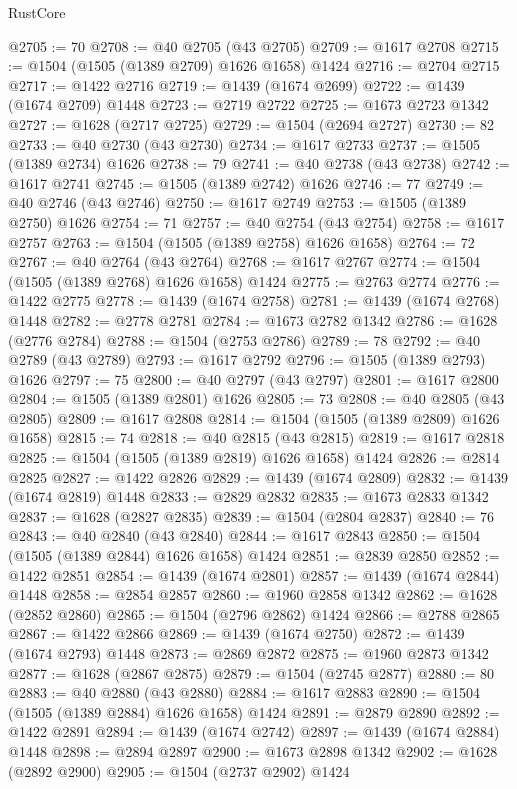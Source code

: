 \begin{lexlean}{RustCore}
\begin{coremodule}
@2705 := 70
@2708 := @40 @2705 (@43 @2705)
@2709 := @1617 @2708
@2715 := @1504 (@1505 (@1389 @2709) @1626 @1658) @1424
@2716 := @2704 @2715
@2717 := @1422 @2716
@2719 := @1439 (@1674 @2699)
@2722 := @1439 (@1674 @2709) @1448
@2723 := @2719 @2722
@2725 := @1673 @2723 @1342
@2727 := @1628 (@2717 @2725)
@2729 := @1504 (@2694 @2727)
@2730 := 82
@2733 := @40 @2730 (@43 @2730)
@2734 := @1617 @2733
@2737 := @1505 (@1389 @2734) @1626
@2738 := 79
@2741 := @40 @2738 (@43 @2738)
@2742 := @1617 @2741
@2745 := @1505 (@1389 @2742) @1626
@2746 := 77
@2749 := @40 @2746 (@43 @2746)
@2750 := @1617 @2749
@2753 := @1505 (@1389 @2750) @1626
@2754 := 71
@2757 := @40 @2754 (@43 @2754)
@2758 := @1617 @2757
@2763 := @1504 (@1505 (@1389 @2758) @1626 @1658)
@2764 := 72
@2767 := @40 @2764 (@43 @2764)
@2768 := @1617 @2767
@2774 := @1504 (@1505 (@1389 @2768) @1626 @1658) @1424
@2775 := @2763 @2774
@2776 := @1422 @2775
@2778 := @1439 (@1674 @2758)
@2781 := @1439 (@1674 @2768) @1448
@2782 := @2778 @2781
@2784 := @1673 @2782 @1342
@2786 := @1628 (@2776 @2784)
@2788 := @1504 (@2753 @2786)
@2789 := 78
@2792 := @40 @2789 (@43 @2789)
@2793 := @1617 @2792
@2796 := @1505 (@1389 @2793) @1626
@2797 := 75
@2800 := @40 @2797 (@43 @2797)
@2801 := @1617 @2800
@2804 := @1505 (@1389 @2801) @1626
@2805 := 73
@2808 := @40 @2805 (@43 @2805)
@2809 := @1617 @2808
@2814 := @1504 (@1505 (@1389 @2809) @1626 @1658)
@2815 := 74
@2818 := @40 @2815 (@43 @2815)
@2819 := @1617 @2818
@2825 := @1504 (@1505 (@1389 @2819) @1626 @1658) @1424
@2826 := @2814 @2825
@2827 := @1422 @2826
@2829 := @1439 (@1674 @2809)
@2832 := @1439 (@1674 @2819) @1448
@2833 := @2829 @2832
@2835 := @1673 @2833 @1342
@2837 := @1628 (@2827 @2835)
@2839 := @1504 (@2804 @2837)
@2840 := 76
@2843 := @40 @2840 (@43 @2840)
@2844 := @1617 @2843
@2850 := @1504 (@1505 (@1389 @2844) @1626 @1658) @1424
@2851 := @2839 @2850
@2852 := @1422 @2851
@2854 := @1439 (@1674 @2801)
@2857 := @1439 (@1674 @2844) @1448
@2858 := @2854 @2857
@2860 := @1960 @2858 @1342
@2862 := @1628 (@2852 @2860)
@2865 := @1504 (@2796 @2862) @1424
@2866 := @2788 @2865
@2867 := @1422 @2866
@2869 := @1439 (@1674 @2750)
@2872 := @1439 (@1674 @2793) @1448
@2873 := @2869 @2872
@2875 := @1960 @2873 @1342
@2877 := @1628 (@2867 @2875)
@2879 := @1504 (@2745 @2877)
@2880 := 80
@2883 := @40 @2880 (@43 @2880)
@2884 := @1617 @2883
@2890 := @1504 (@1505 (@1389 @2884) @1626 @1658) @1424
@2891 := @2879 @2890
@2892 := @1422 @2891
@2894 := @1439 (@1674 @2742)
@2897 := @1439 (@1674 @2884) @1448
@2898 := @2894 @2897
@2900 := @1673 @2898 @1342
@2902 := @1628 (@2892 @2900)
@2905 := @1504 (@2737 @2902) @1424

\end{coremodule}
\end{lexlean}
